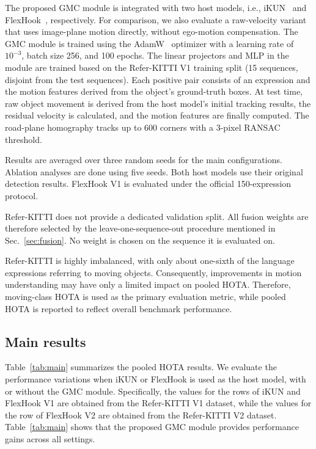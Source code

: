 \documentclass{article}
\begin{document}
The proposed GMC module is integrated with two host models, i.e., iKUN~\cite{ikun} and FlexHook~\cite{flexhook}, respectively. For comparison, we also evaluate a raw-velocity variant that uses image-plane motion directly, without ego-motion compensation. The GMC module is trained using the AdamW~\cite{adamw} optimizer with a learning rate of $10^{-3}$, batch size 256, and 100 epochs. The linear projectors and MLP in the module are trained based on the Refer-KITTI V1 training split (15 sequences, disjoint from the test sequences). Each positive pair consists of an expression and the motion features derived from the object's ground-truth boxes. At test time, raw object movement is derived from the host model's initial tracking results, the residual velocity is calculated, and the motion features are finally computed. The road-plane homography tracks up to 600 corners with a 3-pixel RANSAC threshold. %

Results are averaged over three random seeds for the main configurations. Ablation analyses are done using five seeds. Both host models use their original detection results. FlexHook V1 is evaluated under the official 150-expression protocol. %

Refer-KITTI does not provide a dedicated validation split. All fusion weights are therefore selected by the leave-one-sequence-out procedure mentioned in Sec.~\ref{sec:fusion}. No weight is chosen on the sequence it is evaluated on.

Refer-KITTI is highly imbalanced, with only about one-sixth of the language expressions referring to moving objects. Consequently, improvements in motion understanding may have only a limited impact on pooled HOTA. Therefore, moving-class HOTA is used as the primary evaluation metric, while pooled HOTA is reported to reflect overall benchmark performance. 

\subsection{Main results}
\label{sec:main}
Table~\ref{tab:main} summarizes the pooled HOTA results. We evaluate the performance variations when iKUN or FlexHook is used as the host model, with or without the GMC module. Specifically, the values for the rows of iKUN and FlexHook V1 are obtained from the Refer-KITTI V1 dataset, while the values for the row of FlexHook V2 are obtained from the Refer-KITTI V2 dataset. Table~\ref{tab:main} shows that the proposed GMC module provides performance gains across all settings.
\end{document}
